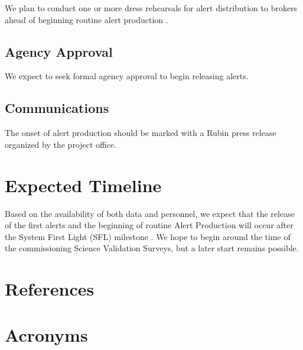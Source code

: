 \documentclass[OPS,authoryear,toc]{lsstdoc}
\begin{document}
We plan to conduct one or more dress rehearsals for alert distribution to brokers ahead of beginning routine alert production .

\subsection{Agency Approval}

We expect to seek formal agency approval to begin releasing alerts.

\subsection{Communications}

The onset of alert production should be marked with a Rubin press release organized by the project office.

\section{Expected Timeline}

Based on the availability of both data and personnel, we expect that the release of the first alerts and the beginning of routine Alert Production will occur after the System First Light (SFL) milestone . 
We hope to begin around the time of the commissioning Science Validation Surveys, but a later start remains possible.



\appendix
\section{References} \label{sec:bib}
\renewcommand{\refname}{} %


\section{Acronyms} \label{sec:acronyms}

\end{document}
